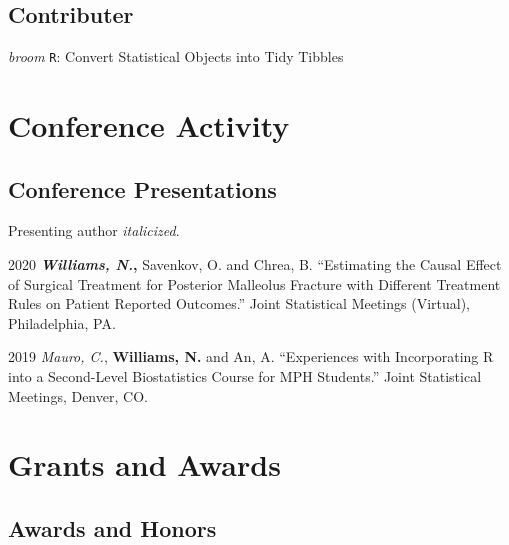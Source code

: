 \documentclass[12pt,letterpaper]{report}
\begin{document}
    \subsection*{Contributer}
    
    \begin{tablist}
    
    	\item[\textit{broom}] \tab \texttt{R}: Convert Statistical Objects into Tidy Tibbles
    
    \end{tablist}

    \section*{Conference Activity}

    \subsection*{Conference Presentations}

    Presenting author \textit{italicized}. \bigskip

    \begin{tablist}
    
	\item[2020] \tab \textbf{\textit{Williams, N.},} Savenkov, O. and Chrea, B. \enquote{Estimating the Causal Effect of Surgical Treatment for Posterior Malleolus Fracture with Different Treatment Rules on Patient Reported Outcomes.} Joint Statistical Meetings (Virtual), Philadelphia, PA.
    
    	\item[2019] \tab \textit{Mauro, C.}, \textbf{Williams, N.} and An, A. \enquote{Experiences with Incorporating R into a Second-Level Biostatistics Course for MPH Students.} Joint Statistical Meetings, Denver, CO.

    \end{tablist}

    \section*{Grants and Awards}

    \subsection*{Awards and Honors}
\end{document}
